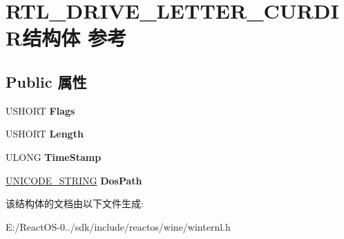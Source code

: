 \hypertarget{struct_r_t_l___d_r_i_v_e___l_e_t_t_e_r___c_u_r_d_i_r}{}\section{R\+T\+L\+\_\+\+D\+R\+I\+V\+E\+\_\+\+L\+E\+T\+T\+E\+R\+\_\+\+C\+U\+R\+D\+I\+R结构体 参考}
\label{struct_r_t_l___d_r_i_v_e___l_e_t_t_e_r___c_u_r_d_i_r}
\subsection*{Public 属性}
\begin{DoxyCompactItemize}
\item 
\mbox{\label{struct_r_t_l___d_r_i_v_e___l_e_t_t_e_r___c_u_r_d_i_r_a65a9f3f2b5aa22de4ab9536e3fede700}} 
U\+S\+H\+O\+RT {\bfseries Flags}
\item 
\mbox{\label{struct_r_t_l___d_r_i_v_e___l_e_t_t_e_r___c_u_r_d_i_r_abf01bbc6e0f6b296554f7a73649515de}} 
U\+S\+H\+O\+RT {\bfseries Length}
\item 
\mbox{\label{struct_r_t_l___d_r_i_v_e___l_e_t_t_e_r___c_u_r_d_i_r_a6748667ef2f957f529eb3bc415516ebd}} 
U\+L\+O\+NG {\bfseries Time\+Stamp}
\item 
\mbox{\label{struct_r_t_l___d_r_i_v_e___l_e_t_t_e_r___c_u_r_d_i_r_a34769b2f9caccfac8fe51bf98039a5c9}} 
\hyperlink{struct___u_n_i_c_o_d_e___s_t_r_i_n_g}{U\+N\+I\+C\+O\+D\+E\+\_\+\+S\+T\+R\+I\+NG} {\bfseries Dos\+Path}
\end{DoxyCompactItemize}


该结构体的文档由以下文件生成\+:\begin{DoxyCompactItemize}
\item 
E\+:/\+React\+O\+S-\/0../sdk/include/reactos/wine/winternl.\+h\end{DoxyCompactItemize}

